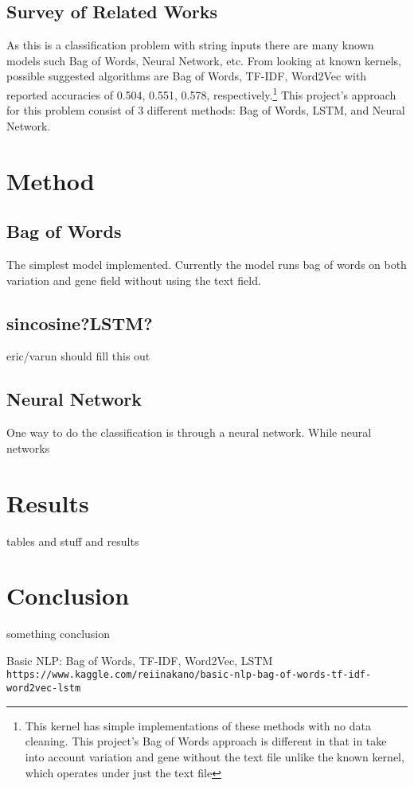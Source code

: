 \documentclass{article}
\begin{document}
    \subsection{Survey of Related Works}
    As this is a classification problem with string inputs there are many known models such Bag of Words, Neural Network, etc.  From looking at known kernels, possible suggested algorithms are Bag of Words, TF-IDF, Word2Vec with reported accuracies of 0.504, 0.551, 0.578, respectively.\footnote{This kernel has simple implementations of these methods with no data cleaning.  This project's Bag of Words approach is different in that in take into account variation and gene without the text file unlike the known kernel, which operates under just the text file}  This project's approach for this problem consist of 3 different methods: Bag of Words, LSTM, and Neural Network.  
    
    \section{Method}
    \subsection{Bag of Words}
    The simplest model implemented.  Currently the model runs bag of words on both variation and gene field without using the text field.  
    \subsection{sincosine?LSTM?}
    eric/varun should fill this out
    \subsection{Neural Network}
    One way to do the classification is through a neural network.  While neural networks
    
    
    
    \section{Results}
    tables and stuff and results
    
    \section{Conclusion}
    something conclusion
    
    \pagebreak
    \begin{thebibliography}{9}
        Basic NLP: Bag of Words, TF-IDF, Word2Vec, LSTM
        \\\texttt{https://www.kaggle.com/reiinakano/basic-nlp-bag-of-words-tf-idf-word2vec-lstm}
      
         
    \end{thebibliography}
    
    
\end{document}
